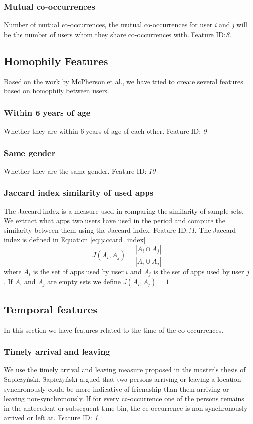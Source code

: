 \subsubsection{Mutual co-occurrences}
Number of mutual co-occurrences, the mutual co-occurrences for user \textit{i} and \textit{j} will be the number of users whom they share co-occurrences with. Feature ID:\textit{8}.

\subsection{Homophily Features}
Based on the work by McPherson et al.\cite{mcpherson2001birds}, we have tried to create several features based on homophily between users.

\subsubsection{Within 6 years of age}
Whether they are within 6 years of age of each other. Feature ID: \textit{9}

\subsubsection{Same gender}
Whether they are the same gender. Feature ID: \textit{10}

\subsubsection{Jaccard index similarity of used apps}
The Jaccard index is a measure used in comparing the similarity of sample sets. We extract what apps two users have used in the period and compute the similarity between them using the Jaccard index. Feature ID:\textit{11}.
The Jaccard index is defined in Equation \ref{eq:jaccard_index}
\begin{equation}
\label{eq:jaccard_index}
J(A_i,A_j) = \frac{ |A_i \cap A_j| }{ |A_i \cup A_j | }
\end{equation}
where $A_i$ is the set of apps used by user $i$ and $A_j$ is the set of apps used by user $j$. If $A_i$ and $A_j$ are empty sets we define $J(A_i, A_j) = 1$

\subsection{Temporal features}
In this section we have features related to the time of the co-occurrences.

\subsubsection{Timely arrival and leaving}
We use the timely arrival and leaving measure proposed in the master's thesis of Sapieżyński\cite{IMM2013-06556}.
Sapieżyński argued that two persons arriving or leaving a location synchronously could be more indicative of friendship than them arriving or leaving non-synchronously. If for every co-occurrence one of the persons remains in the antecedent or subsequent time bin, the co-occurrence is non-synchronously arrived or left at.
Feature ID: \textit{1}.

